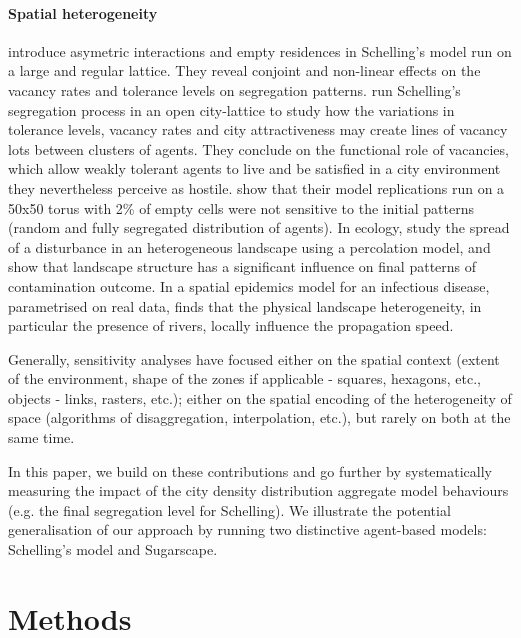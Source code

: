 \documentclass[3p,times,procedia]{elsarticle}
\begin{document}
\paragraph{Spatial heterogeneity} \citet{StaufferSolomon2007} introduce asymetric interactions and empty residences in Schelling's model run on a large and regular lattice. They reveal conjoint and non-linear effects on the vacancy rates and tolerance levels on segregation patterns. \citet{Gauvinetal2010} run Schelling's segregation process in an open city-lattice to study how the variations in tolerance levels, vacancy rates and city attractiveness may create lines of vacancy lots between clusters of agents. They conclude on the functional role of vacancies, which allow weakly tolerant agents to live and be satisfied in a city environment they nevertheless perceive as hostile. \citet{HatnaBenenson2012} show that their model replications run on a 50x50 torus with 2\% of empty cells were not sensitive to the initial patterns (random and fully segregated distribution of agents). In ecology, \citet{smith2002predicting} study the spread of a disturbance in an heterogeneous landscape using a percolation model, and show that landscape structure has a significant influence on final patterns of contamination outcome. In a spatial epidemics model for an infectious disease, parametrised on real data, \citet{smith2002predicting} finds that the physical landscape heterogeneity, in particular the presence of rivers, locally influence the propagation speed.


 Generally, sensitivity analyses have focused either on the spatial context (extent of the environment, shape of the zones if applicable - squares, hexagons, etc., objects - links, rasters, etc.); either on the spatial encoding of the heterogeneity of space (algorithms of disaggregation, interpolation, etc.), but rarely on both at the same time.


In this paper, we build on these contributions and go further by systematically measuring the impact of the city density distribution aggregate model behaviours (e.g. the final segregation level for Schelling). We illustrate the potential generalisation of our approach by running two distinctive agent-based models: Schelling's model and Sugarscape.

\section{Methods}
\end{document}
